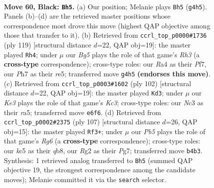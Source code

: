 \documentclass[11pt]{article}
\begin{document}
\clearpage

\begin{figure}[p]\centering
\begin{subfigure}{0.46\textwidth}\centering
\resizebox{\linewidth}{!}{%
\newchessgame
\chessboard[
  setfen={8/7p/4k3/2K1p3/rp4b1/2n5/6r1/8 b - - 11 60},
  showmover=false,
  pgfstyle=straightmove, color=movearrow, markmove={g4-h5}
]}
\caption{}
\end{subfigure}\hfill
\begin{subfigure}{0.46\textwidth}\centering
\resizebox{\linewidth}{!}{%
\newchessgame
\chessboard[
  setfen={8/5p1k/7r/4R3/6P1/7p/5P1K/8 b - - 1 60},
  showmover=false,
  pgfstyle=straightmove, color=movearrow, markmove={h6-h4}
]}
\caption{}
\end{subfigure}
\\[4pt]
\begin{subfigure}{0.46\textwidth}\centering
\resizebox{\linewidth}{!}{%
\newchessgame
\chessboard[
  setfen={8/1k6/1P2p3/r7/8/2K5/1R5P/8 w - - 7 52},
  showmover=false,
  pgfstyle=straightmove, color=movearrow, markmove={c3-d3}
]}
\caption{}
\end{subfigure}\hfill
\begin{subfigure}{0.46\textwidth}\centering
\resizebox{\linewidth}{!}{%
\newchessgame
\chessboard[
  setfen={1Q6/6p1/4P1b1/6pk/8/1p4r1/8/5K2 b - - 0 54},
  showmover=false,
  pgfstyle=straightmove, color=movearrow, markmove={g3-f3}
]}
\caption{}
\end{subfigure}
\caption{\textbf{Move 60, Black: \texttt{Bh5}.} (a) Our position; Melanie plays \texttt{Bh5} (\texttt{g4h5}). Panels (b)--(d) are the retrieved master positions whose correspondence most drove this move (highest QAP objective among those that transfer to it). (b) Retrieved from \texttt{ccrl\_top\_p0000\#1736} (ply 119) [structural distance $d$=22, QAP obj=19]: the master played \texttt{Rh4}; under $\mu$ our \emph{Bg5} plays the role of that game's \emph{Rh3} (a \textbf{cross-type} correspondence); cross-type roles: our \emph{R}a4 as their \emph{P}f7, our \emph{P}h7 as their \emph{r}e5; transferred move \texttt{g4h5} \textbf{(endorses this move)}. (c) Retrieved from \texttt{ccrl\_top\_p0003\#1602} (ply 102) [structural distance $d$=22, QAP obj=19]: the master played \texttt{Kd3}; under $\mu$ our \emph{Ke3} plays the role of that game's \emph{Kc3}; cross-type roles: our \emph{N}c3 as their \emph{r}a5; transferred move \texttt{e6f6}. (d) Retrieved from \texttt{ccrl\_top\_p0002\#2375} (ply 107) [structural distance $d$=26, QAP obj=15]: the master played \texttt{Rf3+}; under $\mu$ our \emph{Pb5} plays the role of that game's \emph{Rg6} (a \textbf{cross-type} correspondence); cross-type roles: our \emph{k}c5 as their \emph{q}b8, our \emph{R}g2 as their \emph{P}g7; transferred move \texttt{b4b3}. Synthesis: 1 retrieved analog transferred to \texttt{Bh5} (summed QAP objective 19, the strongest correspondence among the candidate moves); Melanie committed it via the \texttt{search} selector.}
\label{fig:thought-m119}
\end{figure}
\end{document}
